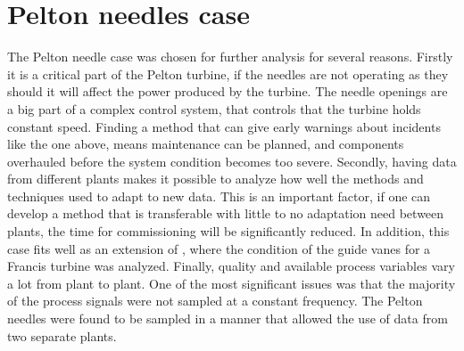 \section{Pelton needles case}\label{sec:pelton_needles}
    The Pelton needle case was chosen for further analysis for several reasons. Firstly it is a critical part of the Pelton turbine, if the needles are not operating as they should it will affect the power produced by the turbine. The needle openings are a big part of a complex control system, that controls that the turbine holds constant speed. Finding a method that can give early warnings about incidents like the one above, means maintenance can be planned, and components overhauled before the system condition becomes too severe. Secondly, having data from different plants makes it possible to analyze how well the methods and techniques used to adapt to new data. This is an important factor, if one can develop a method that is transferable with little to no adaptation need between plants, the time for commissioning will be significantly reduced. In addition, this case fits well as an extension of \cite{Aasnes2017}, where the condition of the guide vanes for a Francis turbine was analyzed. Finally, quality and available process variables vary a lot from plant to plant. One of the most significant issues was that the majority of the process signals were not sampled at a constant frequency. The Pelton needles were found to be sampled in a manner that allowed the use of data from two separate plants.
             


